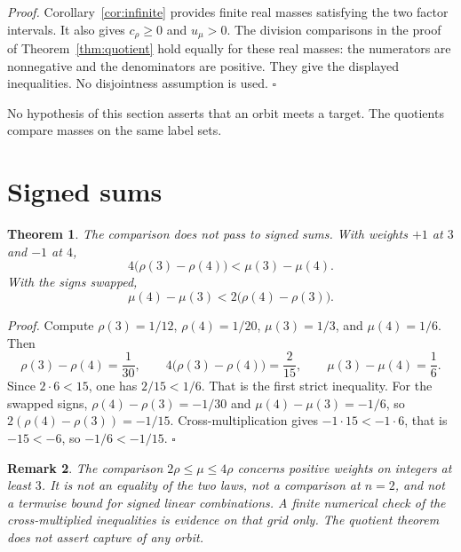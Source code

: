 \documentclass[11pt,letterpaper]{article}
\newtheorem{theorem}{Theorem}
\newtheorem{remark}[theorem]{Remark}
\newenvironment{proof}{\noindent\textit{Proof.}}{\hfill\(\square\)}
\begin{document}
\begin{proof}
Corollary~\ref{cor:infinite} provides finite real masses satisfying the two factor intervals. It also gives $c_\rho\ge0$ and $u_\mu>0$. The division comparisons in the proof of Theorem~\ref{thm:quotient} hold equally for these real masses: the numerators are nonnegative and the denominators are positive. They give the displayed inequalities. No disjointness assumption is used.
\end{proof}

No hypothesis of this section asserts that an orbit meets a target. The quotients compare masses on the same label sets.

\section{Signed sums}

\begin{theorem}
\label{thm:signed}
The comparison does not pass to signed sums. With weights $+1$ at $3$ and $-1$ at $4$,
\begin{equation*}
4\bigl(\rho(3)-\rho(4)\bigr)<\mu(3)-\mu(4).
\end{equation*}
With the signs swapped,
\begin{equation*}
\mu(4)-\mu(3)<2\bigl(\rho(4)-\rho(3)\bigr).
\end{equation*}
\end{theorem}

\begin{proof}
Compute $\rho(3)=1/12$, $\rho(4)=1/20$, $\mu(3)=1/3$, and $\mu(4)=1/6$. Then
\begin{equation*}
\rho(3)-\rho(4)=\frac{1}{30},
\qquad
4\bigl(\rho(3)-\rho(4)\bigr)=\frac{2}{15},
\qquad
\mu(3)-\mu(4)=\frac{1}{6}.
\end{equation*}
Since $2\cdot 6<15$, one has $2/15<1/6$. That is the first strict inequality. For the swapped signs, $\rho(4)-\rho(3)=-1/30$ and $\mu(4)-\mu(3)=-1/6$, so $2(\rho(4)-\rho(3))=-1/15$. Cross-multiplication gives $-1\cdot 15<-1\cdot 6$, that is $-15<-6$, so $-1/6<-1/15$.
\end{proof}

\begin{remark}
\label{rem:not}
The comparison $2\rho\le\mu\le 4\rho$ concerns positive weights on integers at least $3$. It is not an equality of the two laws, not a comparison at $n=2$, and not a termwise bound for signed linear combinations. A finite numerical check of the cross-multiplied inequalities is evidence on that grid only. The quotient theorem does not assert capture of any orbit.
\end{remark}
\end{document}
